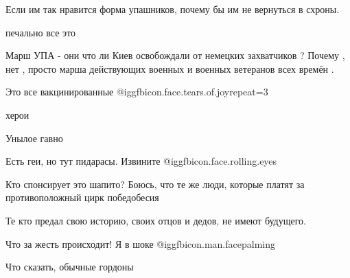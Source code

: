 \begin{itemize}
Если им так нравится форма упашников, почему бы им не вернуться в схроны.

печально все это

Марш УПА - они что ли Киев освобождали от немецких захватчиков ?
Почему , нет , просто марша действующих военных и военных ветеранов всех времён .

Это все вакцинированные @igg{fbicon.face.tears.of.joy}{repeat=3} 

херои

Унылое гавно

Есть геи, но тут пидарасы. Извините @igg{fbicon.face.rolling.eyes} 

Кто спонсирует это шапито? Боюсь, что те же люди, которые платят за противоположный цирк победобесия

Те кто предал свою историю, своих отцов и дедов, не имеют будущего.

Что за жесть происходит! Я в шоке @igg{fbicon.man.facepalming} 

Что сказать, обычные гордоны

\end{itemize} %
